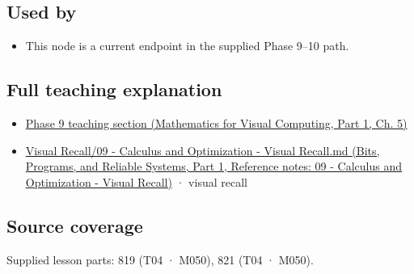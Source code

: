 \subsection{Used by}\label{appendix-e2d476574aab-used-by}

\hypertarget{appendix-e2d476574aab-used-by}{}

\begin{itemize}
\tightlist
\item
  This node is a current endpoint in the supplied Phase 9--10 path.
\end{itemize}

\subsection{Full teaching explanation}\label{appendix-e2d476574aab-full-teaching-explanation}

\hypertarget{appendix-e2d476574aab-full-teaching-explanation}{}

\begin{itemize}
\tightlist
\item
  \href{../02-Mathematics-for-Visual-Computing-P01/main.pdf\#02-foundations-ii-ch021-multivariable-derivatives-and-sensitivity-1}{Phase 9 teaching section (Mathematics for Visual Computing, Part 1, Ch. 5)}
\item
  \href{../01-Bits-Programs-and-Reliable-Systems-P01/main.pdf\#appendix-adf48f5dc5c1}{Visual Recall/09 - Calculus and Optimization - Visual Recall.md (Bits, Programs, and Reliable Systems, Part 1, Reference notes: 09 - Calculus and Optimization - Visual Recall)} · visual recall
\end{itemize}

\subsection{Source coverage}\label{appendix-e2d476574aab-source-coverage}

\hypertarget{appendix-e2d476574aab-source-coverage}{}

Supplied lesson parts: 819 (T04 · M050), 821 (T04 · M050).
